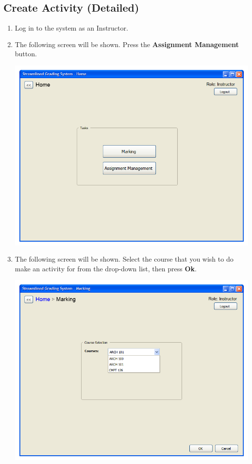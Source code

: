 \documentclass{article}
\begin{document}
\subsection{Create Activity (Detailed)}
\begin{enumerate}
  \item Log in to the system as an Instructor.
  \item The following screen will be shown.
    Press the \textbf{Assignment Management} button.
  \begin{center} 
   \includegraphics[scale=0.55]{../images/UIMockups/pngs/LandingPage}
  \end{center}
  \item The following screen will be shown.  Select the course that you wish
    to do make an activity for from the drop-down list, then press \textbf{Ok}.
    \begin{center} 
      \includegraphics[scale=0.55]{../images/UIMockups/pngs/CourseSelectionM}

\end{center}
\end{enumerate}
\end{document}
